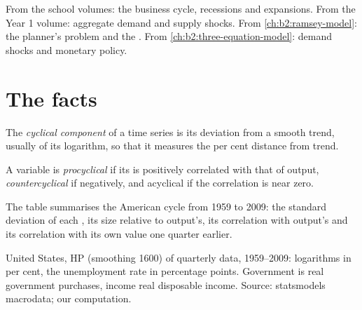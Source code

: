 \begin{recall}
From the school volumes: the business cycle, recessions and expansions. From the Year 1 volume: aggregate demand and supply
shocks. From \cref{ch:b2:ramsey-model}: the planner's problem and the . From
\cref{ch:b2:three-equation-model}: demand shocks and monetary policy.
\end{recall}

\section{The facts}\label{sec:b2:business-cycles:facts}

\begin{definition}\label{def:b2:business-cycles:cyclical-component}
The \emph{cyclical component} of a time series is its deviation from a smooth trend, usually of
its logarithm, so that it measures the per cent distance from trend.
\end{definition}

\begin{definition}\label{def:b2:business-cycles:procyclical}
A variable is \emph{procyclical} if its  is positively correlated with that
of output, \emph{countercyclical} if negatively, and acyclical if the correlation is near
zero.
\end{definition}

The table summarises the American cycle from 1959 to 2009: the standard deviation of each , its size relative to
output's, its correlation with output's and its correlation with its own value one quarter earlier.

\begin{center}

{\small United States, HP  (smoothing 1600) of quarterly data, 1959--2009: logarithms in per cent, the
unemployment rate in percentage points. Government is real government purchases, income real disposable income. Source: statsmodels macrodata; our computation.}
\end{center}

